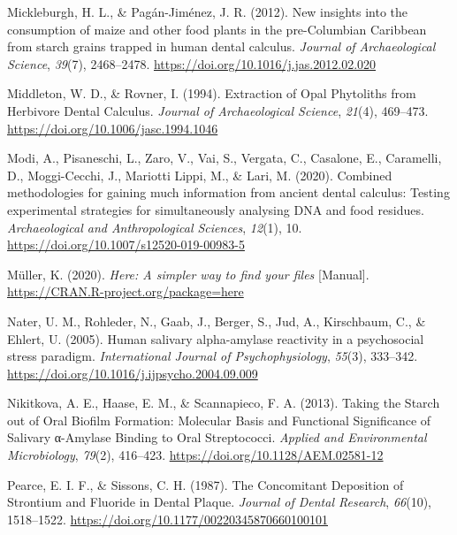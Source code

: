 \documentclass[
  letterpaper,
]{book}
\newlength{\cslhangindent}
\newlength{\cslentryspacingunit} %
\newenvironment{CSLReferences}[2] %
 {%
  \setlength{\parindent}{0pt}
  \ifodd #1
  \let\oldpar\par
  \def\par{\hangindent=\cslhangindent\oldpar}
  \fi
  \setlength{\parskip}{#2\cslentryspacingunit}
 }%
 {}
\begin{document}
\begin{CSLReferences}{1}{0}
\leavevmode{}%
Mickleburgh, H. L., \& Pagán-Jiménez, J. R. (2012). New insights into
the consumption of maize and other food plants in the pre-{Columbian
Caribbean} from starch grains trapped in human dental calculus.
\emph{Journal of Archaeological Science}, \emph{39}(7), 2468--2478.
\url{https://doi.org/10.1016/j.jas.2012.02.020}

\leavevmode{}%
Middleton, W. D., \& Rovner, I. (1994). Extraction of {Opal Phytoliths}
from {Herbivore Dental Calculus}. \emph{Journal of Archaeological
Science}, \emph{21}(4), 469--473.
\url{https://doi.org/10.1006/jasc.1994.1046}

\leavevmode{}%
Modi, A., Pisaneschi, L., Zaro, V., Vai, S., Vergata, C., Casalone, E.,
Caramelli, D., Moggi-Cecchi, J., Mariotti Lippi, M., \& Lari, M. (2020).
Combined methodologies for gaining much information from ancient dental
calculus: Testing experimental strategies for simultaneously analysing
{DNA} and food residues. \emph{Archaeological and Anthropological
Sciences}, \emph{12}(1), 10.
\url{https://doi.org/10.1007/s12520-019-00983-5}

\leavevmode{}%
Müller, K. (2020). \emph{Here: {A} simpler way to find your files}
{[}Manual{]}. \url{https://CRAN.R-project.org/package=here}

\leavevmode{}%
Nater, U. M., Rohleder, N., Gaab, J., Berger, S., Jud, A., Kirschbaum,
C., \& Ehlert, U. (2005). Human salivary alpha-amylase reactivity in a
psychosocial stress paradigm. \emph{International Journal of
Psychophysiology}, \emph{55}(3), 333--342.
\url{https://doi.org/10.1016/j.ijpsycho.2004.09.009}

\leavevmode{}%
Nikitkova, A. E., Haase, E. M., \& Scannapieco, F. A. (2013). Taking the
{Starch} out of {Oral Biofilm Formation}: {Molecular Basis} and
{Functional Significance} of {Salivary} α-{Amylase Binding} to {Oral
Streptococci}. \emph{Applied and Environmental Microbiology},
\emph{79}(2), 416--423. \url{https://doi.org/10.1128/AEM.02581-12}

\leavevmode{}%
Pearce, E. I. F., \& Sissons, C. H. (1987). The {Concomitant Deposition}
of {Strontium} and {Fluoride} in {Dental Plaque}. \emph{Journal of
Dental Research}, \emph{66}(10), 1518--1522.
\url{https://doi.org/10.1177/00220345870660100101}


\end{CSLReferences}
\end{document}
